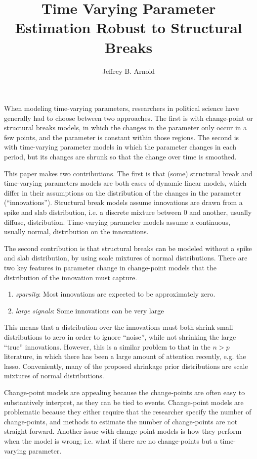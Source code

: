 \documentclass{article}
\author{Jeffrey B. Arnold}
\title{Time Varying Parameter Estimation Robust to Structural Breaks}
\begin{document}
\maketitle{}

When modeling time-varying parameters, researchers in political science have generally had to choose between two approaches. 
The first is with change-point or structural breaks models, in which the changes in the parameter only occur in a few points, and the parameter is constant within those regions.
The second is with time-varying parameter models in which the parameter changes in each period, but its changes are shrunk so that the change over time is smoothed.

This paper makes two contributions.
The first is that (some) structural break and time-varying parameters models are both cases of dynamic linear models, which differ in their assumptions on the distribution of the changes in the parameter (``innovations'').
Structural break models assume innovations are drawn from a spike and slab distribution, i.e. a discrete mixture between 0 and another, usually diffuse, distribution.
Time-varying parameter models assume a continuous, usually normal, distribution on the innovations.

The second contribution is that structural breaks can be modeled without a spike and slab distribution, by using scale mixtures of normal distributions.
There are two key features in parameter change in change-point models that the distribution of the innovation must capture.
\begin{enumerate}
\item \textit{sparsity}: Most innovations are expected to be approximately zero.
\item \textit{large signals}: Some innovations can be very large
\end{enumerate}
This means that a distribution over the innovations must both shrink small distributions to zero in order to ignore ``noise'', while not shrinking the large ``true'' innovations.
However, this is a similar problem to that in the $n > p$ literature, in which there has been a large amount of attention recently, e.g. the lasso.
Conveniently, many of the proposed shrinkage prior distributions are scale mixtures of normal distributions.

Change-point models are appealing because the change-points are often easy to substantively interpret, as they can be tied to events.
Change-point models are problematic because they either require that the researcher specify the number of change-points, and methods to estimate the number of change-points are not straight-forward.
Another issue with change-point models is how they perform when the model is wrong; i.e. what if there are no change-points but a time-varying parameter.
\end{document}
